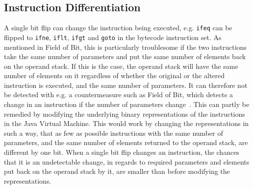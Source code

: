 \subsection{Instruction Differentiation} 
A single bit flip can change the instruction being executed, e.g. \texttt{ifeq} can be flipped to \texttt{ifne}, \texttt{iflt}, \texttt{ifgt} and \texttt{goto} in the \jc bytecode instruction set. As mentioned in Field of Bit, this is particularly troublesome if the two instructions take the same number of parameters and put the same number of elements back on the operand stack. If this is the case, the operand stack will have the same number of elements on it regardless of whether the original or the altered instruction is executed, and the same number of parameters. It can therefore not be detected with e.g. a countermeasure such as Field of Bit, which detects a change in an instruction if the number of parameters change~\cite[p. 16]{javasec}.
This can partly be remedied by modifying the underlying binary representations of the instructions in the Java Virtual Machine.
This would work by changing the representations in such a way, that as few as possible instructions with the same number of parameters, and the same number of elements returned to the operand stack, are different by one bit. 
When a single bit flip changes an instruction, the chances that it is an undetectable change, in regards to required parameters and elements put back on the operand stack by it, are smaller than before modifying the representations.


